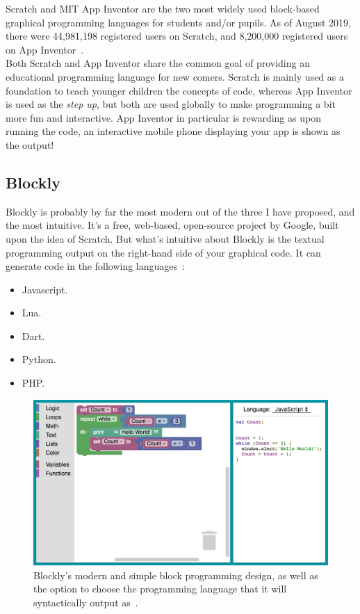\documentclass[a4paper, 12pt]{article}
\begin{document}
            \clearpage
            Scratch and MIT App Inventor are the two most widely used block-based graphical programming
            languages for students and/or pupils. As of August 2019, there were 44,981,198 registered
            users on Scratch, and 8,200,000 registered users on App Inventor~\cite{park2019comparing}. \\

            Both Scratch and App Inventor share the common goal of providing an educational programming
            language for new comers. Scratch is mainly used as a foundation to teach younger children
            the concepts of code, whereas App Inventor is used as the \textit{step up}, but both are
            used globally to make programming a bit more fun and interactive. App Inventor in particular
            is rewarding as upon running the code, an interactive mobile phone displaying your app is
            shown as the output!

        \subsection{Blockly}
            Blockly is probably by far the most modern out of the three I have proposed, and the 
            most intuitive. It's a free, web-based, open-source project by Google, built upon the 
            idea of Scratch. But what's intuitive about Blockly is the textual programming output 
            on the right-hand side of your graphical code. It can generate code in the following 
            languages~\cite{nbcbayarea}:

            \begin{itemize}
                \item Javascript.
                \item Lua.
                \item Dart.
                \item Python.
                \item PHP.
            \end{itemize}

            \begin{figure}[h]
                \centering
                \includegraphics[width=150mm]{blockly.png}
                \caption{Blockly's modern and simple block programming design, as well 
                as the option to choose the programming language that it will syntactically 
                output as~\cite{blockly}.}
            \end{figure}
\end{document}
